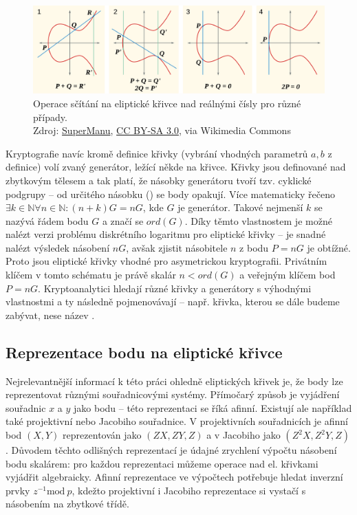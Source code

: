 \documentclass{article}
\theoremstyle{definition}
\begin{document}
\begin{figure}
    \centering
    \includegraphics[width=\textwidth]{ecc_ops.png}
    \caption{Operace sčítání na eliptické křivce nad reálnými čísly pro různé případy. \\ Zdroj: \href{https://commons.wikimedia.org/wiki/File:ECClines-2.svg}{SuperManu},  \href{https://creativecommons.org/licenses/by-sa/3.0}{CC BY-SA 3.0}, via Wikimedia Commons}
    \label{fig:ecc_ops}
\end{figure}

Kryptografie navíc kromě definice křivky (vybrání vhodných parametrů $a,b$ z definice) volí  zvaný generátor, ležící někde na křivce. Křivky jsou definované nad zbytkovým tělesem a tak platí, že násobky generátoru tvoří tzv. cyklické podgrupy -- od určitého násobku () se body opakují. Více matematicky řečeno $\exists k \in \mathbb{N} \forall n \in \mathbb{N}: (n+k)G = nG$, kde $G$ je generátor. Takové nejmenší $k$ se nazývá řádem bodu $G$ a značí se $ord(G)$. Díky těmto vlastnostem je možné nalézt verzi problému diskrétního logaritmu pro eliptické křivky -- je snadné nalézt výsledek násobení $nG$, avšak zjistit násobitele $n$ z bodu $P=nG$ je obtížné. Proto jsou eliptické křivky vhodné pro asymetrickou kryptografii. Privátním klíčem v tomto schématu je právě skalár $n < ord(G)$ a veřejným klíčem bod $P=nG$. Kryptoanalytici hledají různé křivky a generátory s výhodnými vlastnostmi a ty následně pojmenovávají -- např. křivka, kterou se dále budeme zabývat, nese název .

\subsection{Reprezentace bodu na eliptické křivce}
Nejrelevantnější informací k této práci ohledně eliptických křivek je, že body lze reprezentovat různými souřadnicovými systémy. Přímočarý způsob je vyjádření souřadnic $x$ a $y$ jako bodu -- této reprezentaci se říká afinní. Existují ale například také projektivní nebo Jacobiho souřadnice. V projektivních souřadnicích je afinní bod $(X,Y)$ reprezentován jako $(ZX, ZY, Z)$ a v Jacobiho jako $(Z^2X, Z^2Y, Z)$. Důvodem těchto odlišných reprezentací je údajné zrychlení výpočtu násobení bodu skalárem: pro každou reprezentaci můžeme operace nad el. křivkami vyjádřit algebraicky. Afinní reprezentace ve výpočtech potřebuje hledat inverzní prvky $z^{-1} \text{mod}~ p$, kdežto projektivní i Jacobiho reprezentace si vystačí s násobením na zbytkové třídě. 
\end{document}
